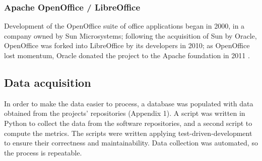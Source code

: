 \begin{description}
  
  
\end{description}

\subsubsection{Apache OpenOffice / LibreOffice}
Development of the OpenOffice suite of office applications began in 2000, in a company owned by Sun Microsystems; following the acquisition of Sun by Oracle, OpenOffice was forked into LibreOffice by its developers in 2010; as OpenOffice lost momentum, Oracle donated the project to the Apache foundation in 2011 \citep{Gamalielsson2014b}.

\begin{description}
  

\end{description}

\subsection{Data acquisition}
In order to make the data easier to process, a database was populated with data obtained from the projects' repositories (Appendix 1). A script was written in Python to collect the data from the software repositories, and a second script to compute the metrics. The scripts were written applying test-driven-development to ensure their correctness and maintainability. Data collection was automated, so the process is repeatable.

